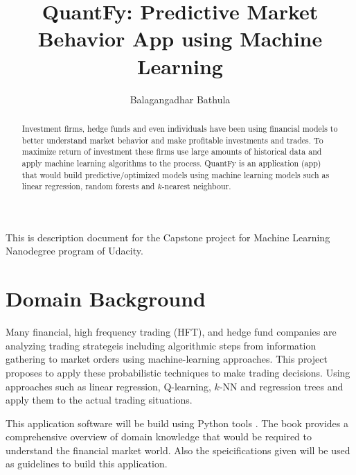 \documentclass[12pt]{article}
\title{QuantFy: Predictive Market Behavior App using Machine Learning }
\author{Balagangadhar Bathula}
\begin{document}
\maketitle

\begin{abstract}
Investment firms, hedge funds and even individuals have been using financial models to better understand market behavior and make profitable investments and trades.  To maximize return of investment these firms use large amounts of historical data and apply machine learning algorithms to the process.
QuantFy is an application (app) that would build predictive/optimized models using machine learning models such as linear regression, random forests and $k$-nearest neighbour. 


\end{abstract}

\newpage
\tableofcontents
\newpage
\listoffigures
\newpage
\listoftables
\newpage

This is description document for the Capstone project for Machine Learning Nanodegree program of Udacity. 

\section{Domain Background}
\label{sec:background}
Many financial, high frequency trading (HFT), and hedge fund companies are analyzing trading strategeis including algorithmic steps from information gathering to market orders using machine-learning approaches. This project proposes to apply these probabilistic techniques to make trading decisions. Using approaches such as linear regression, Q-learning, $k$-NN and regression trees and apply them to the actual trading situations.

This application software will be build using Python tools \cite{PyFi}. The book \cite{HeFu} provides a comprehensive overview of domain knowledge that would be required to understand the financial market world. Also the speicifications given \cite{GeTechCourse} will be used as guidelines to build this application. 
\end{document}

